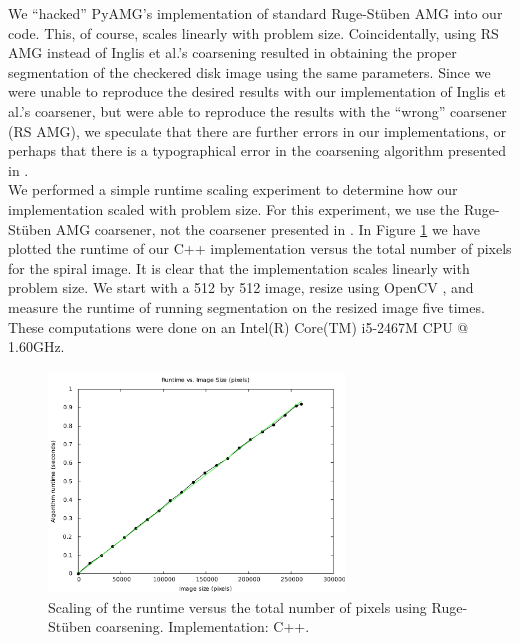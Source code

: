 \documentclass[12pt]{article}%
\begin{document}
We ``hacked'' PyAMG's implementation \cite{pyamg:2011} of standard Ruge-St\"uben AMG into our code.  This, of course, scales linearly with problem size.  Coincidentally, using RS AMG instead of Inglis et al.'s coarsening resulted in obtaining the proper segmentation of the checkered disk image using the same parameters.  Since we were unable to reproduce the desired results with our implementation of Inglis et al.'s coarsener, but were able to reproduce the results with the ``wrong'' coarsener (RS AMG), we speculate that there are further errors in our implementations, or perhaps that there is a typographical error in the coarsening algorithm presented in \cite{inglis:2010}.\\  %

We performed a simple runtime scaling experiment to determine how our implementation scaled with problem size.  For this experiment, we use the Ruge-St\"uben AMG coarsener, not the coarsener presented in \cite{inglis:2010}.  In Figure \ref{fig:runtime_scaling} we have plotted the runtime of our C++ implementation versus the total number of pixels for the spiral image.  It is clear that the implementation scales linearly with problem size.  We start with a 512 by 512 image, resize using OpenCV \cite{opencv:2000}, and measure the runtime of running segmentation on the resized image five times.  These computations were done on an Intel(R) Core(TM) i5-2467M CPU @ 1.60GHz.\\

\begin{figure}[ht]
   \centering
   \includegraphics[width=0.7\textwidth]{runtime_scaling_RSAMG_spiral_512_james.pdf}
   \caption{Scaling of the runtime versus the total number of pixels using Ruge-St\"uben coarsening.  Implementation: C++.}
   \label{fig:runtime_scaling}
\end{figure}
\end{document}
